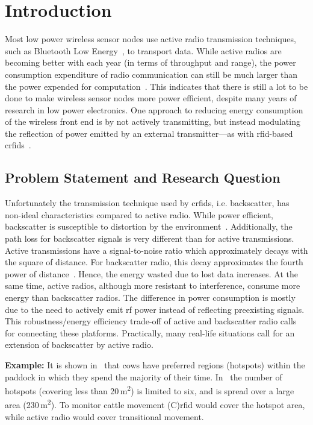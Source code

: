 \documentclass[conference,letterpaper,twoside,final,10pt]{IEEEtran}
\begin{document}
\setlength{\textfloatsep}{0pt}

\section{Introduction}
\label{sec:introduction}

Most low power wireless sensor nodes use active radio transmission techniques, such as Bluetooth Low Energy~\cite{gomez2012sensors}, to transport data.
While active radios are becoming better with each year (in terms of throughput and range), the power consumption expenditure of radio communication can still be much larger than the power expended for computation~\cite{fonseca2008quanto}.
This indicates that there is still a lot to be done to make wireless sensor nodes more power efficient, despite many years of research in low power electronics.
One approach to reducing energy consumption of the wireless front end is by not actively transmitting, but instead modulating the reflection of power emitted by an external transmitter---as with \ac{rfid}-based \acp{crfid}~\cite{sample2008im}.

\subsection{Problem Statement and Research Question}
\label{sec:introduction/problem}

Unfortunately the transmission technique used by \acp{crfid}, i.e. backscatter, has non-ideal characteristics compared to active radio.
While power efficient, backscatter is susceptible to distortion by the environment~\cite[Fig. 4]{zhang2012mobisys}.
Additionally, the path loss for backscatter signals is very different than for active transmissions.
Active transmissions have a signal-to-noise ratio which approximately decays with the square of distance.
For backscatter radio, this decay approximates the fourth power of distance~\cite[Sec. 2.2]{zhang2012mobisys}.
Hence, the energy wasted due to lost data increases.
At the same time, active radios, although more resistant to interference, consume more energy than backscatter radios.
The difference in power consumption is mostly due to the need to actively emit \ac{rf} power instead of reflecting preexisting signals.
This robustness/energy efficiency trade-off of active and backscatter radio calls for connecting these platforms.
Practically, many real-life situations call for an extension of backscatter by active radio.

\textbf{Example:} It is shown in~\cite{guo2009cows} that cows have preferred regions (hotspots) within the paddock in which they spend the majority of their time. In~\cite[Fig. 3]{guo2009cows} the number of hotspots (covering less than 20\,\si{\square\meter}) is limited to six, and is spread over a large area (230\,\si{\square\meter}). To monitor cattle movement (C)\acs{rfid} would cover the hotspot area, while active radio would cover transitional movement.
\end{document}
